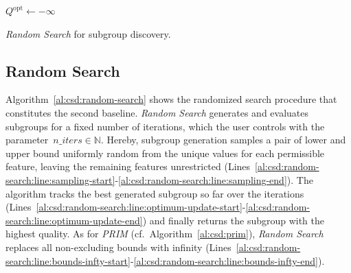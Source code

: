 \documentclass{article}
\theoremstyle{definition}
\begin{document}
\begin{algorithm}[t]
	\DontPrintSemicolon
	\BlankLine
	$Q^{\text{opt}} \leftarrow - \infty$\;
	\caption{\emph{Random Search} for subgroup discovery.}
	\label{al:csd:random-search}
\end{algorithm}

\subsection{Random Search}
\label{sec:csd:baselines:random-search}

Algorithm~\ref{al:csd:random-search} shows the randomized search procedure that constitutes the second baseline.
\emph{Random Search} generates and evaluates subgroups for a fixed number of iterations, which the user controls with the parameter~$\mathit{n\_iters} \in \mathbb{N}$.
Hereby, subgroup generation samples a pair of lower and upper bound uniformly random from the unique values for each permissible feature, leaving the remaining features unrestricted (Lines~\ref{al:csd:random-search:line:sampling-start}-\ref{al:csd:random-search:line:sampling-end}).
The algorithm tracks the best generated subgroup so far over the iterations (Lines~\ref{al:csd:random-search:line:optimum-update-start}-\ref{al:csd:random-search:line:optimum-update-end}) and finally returns the subgroup with the highest quality.
As for \emph{PRIM} (cf.~Algorithm~\ref{al:csd:prim}), \emph{Random Search} replaces all non-excluding bounds with infinity (Lines~\ref{al:csd:random-search:line:bounds-infty-start}-\ref{al:csd:random-search:line:bounds-infty-end}).
\end{document}
